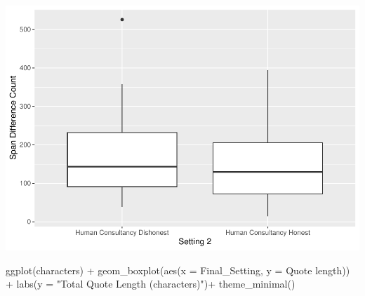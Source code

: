 \documentclass[
]{article}
\newenvironment{Shaded}{\begin{snugshade}}{\end{snugshade}}
\newcommand{\AttributeTok}[1]{\textcolor[rgb]{0.77,0.63,0.00}{#1}}
\newcommand{\FunctionTok}[1]{\textcolor[rgb]{0.00,0.00,0.00}{#1}}
\newcommand{\NormalTok}[1]{#1}
\newcommand{\OtherTok}[1]{\textcolor[rgb]{0.56,0.35,0.01}{#1}}
\newcommand{\SpecialCharTok}[1]{\textcolor[rgb]{0.00,0.00,0.00}{#1}}
\newcommand{\StringTok}[1]{\textcolor[rgb]{0.31,0.60,0.02}{#1}}
\begin{document}
\begin{Shaded}
\end{Shaded}

\includegraphics[width=1\linewidth]{debate-2309_files/figure-latex/quote_length graph-1}

\begin{Shaded}
\begin{Highlighting}[]
\FunctionTok{ggplot}\NormalTok{(characters) }\SpecialCharTok{+}
  \FunctionTok{geom\_boxplot}\NormalTok{(}\FunctionTok{aes}\NormalTok{(}\AttributeTok{x =}\NormalTok{ Final\_Setting, }\AttributeTok{y =} \StringTok{\textasciigrave{}}\AttributeTok{Quote length}\StringTok{\textasciigrave{}}\NormalTok{)) }\SpecialCharTok{+}
  \FunctionTok{labs}\NormalTok{(}\AttributeTok{y =} \StringTok{"Total Quote Length (characters)"}\NormalTok{)}\SpecialCharTok{+}
  \FunctionTok{theme\_minimal}\NormalTok{()}
\end{Highlighting}
\end{Shaded}
\end{document}
